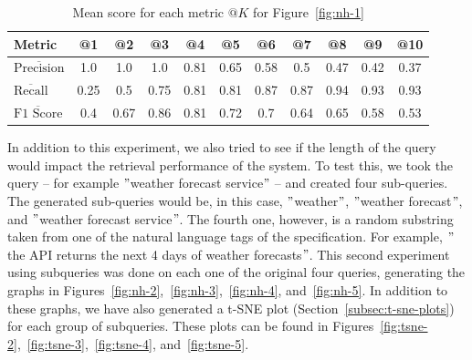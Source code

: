 \begin{table}[!h]
    \begin{center}
        \begin{tabular}{l c c c c c c c c c c}
            \hline
            \textbf{Metric} & \textbf{@1} & \textbf{@2} & \textbf{@3} & \textbf{@4} & \textbf{@5} & \textbf{@6} & \textbf{@7} & \textbf{@8} & \textbf{@9} & \textbf{@10} \\ \hline
            $\overline{\text{Precision}}$ & 1.0 & 1.0 & 1.0 & 0.81 & 0.65 & 0.58 & 0.5 & 0.47 & 0.42 & 0.37 \\
            $\overline{\text{Recall}}$ & 0.25 & 0.5 & 0.75 & 0.81 & 0.81 & 0.87 & 0.87 & 0.94 & 0.93 & 0.93 \\
            $\overline{\text{F1 Score}}$ & 0.4 & 0.67 & 0.86 & 0.81 & 0.72 & 0.7 & 0.64 & 0.65 & 0.58 & 0.53 \\ \hline
        \end{tabular}
    \end{center}

    \caption{Mean score for each metric $@K$ for Figure~\ref{fig:nh-1}}
    \label{tab:metrics-prf}
\end{table}

\noindent In addition to this experiment, we also tried to see if the length of the query would impact the retrieval performance of the system.
To test this, we took the query -- for example \("\)weather forecast service\("\) -- and created four sub-queries.
The generated sub-queries would be, in this case, \("\)weather\("\), \("\)weather forecast\("\), and \("\)weather forecast service\("\).
The fourth one, however, is a random substring taken from one of the natural language tags of the specification.
For example, \("\)the API returns the next 4 days of weather forecasts\("\).
This second experiment using subqueries was done on each one of the original four queries, generating the graphs in Figures~\ref{fig:nh-2},~\ref{fig:nh-3},~\ref{fig:nh-4}, and~\ref{fig:nh-5}.
In addition to these graphs, we have also generated a t-SNE plot (Section~\ref{subsec:t-sne-plots}) for each group of subqueries.
These plots can be found in Figures~\ref{fig:tsne-2},~\ref{fig:tsne-3},~\ref{fig:tsne-4}, and~\ref{fig:tsne-5}.

